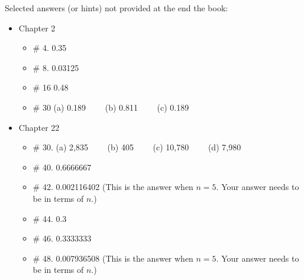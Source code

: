 \documentclass[12pt]{article}
\begin{document}
Selected answers (or hints) not provided at the end the book:
\begin{itemize}  %


\item Chapter 2          \label{ANS_2}
	\begin{itemize}
	\item  \# 4.  0.35
	\item  \# 8. 0.03125
	\item  \# 16 0.48
	\item  \# 30 (a) 0.189  \ \ \ \ (b) 0.811 \ \ \ \ (c)  0.189
	\end{itemize}


\item Chapter 22          \label{ANS_22}
	\begin{itemize}
	\item  \# 30. (a) 2,835  \ \ \ \ (b) 405 \ \ \ \  (c) 10,780  \ \ \ \ (d) 7,980 
	\item  \# 40. 0.6666667
	\item  \# 42. 0.002116402  (This is the answer when $n=5$. Your answer needs to be in terms of $n$.)
	\item  \# 44. 0.3
	\item  \# 46. 0.3333333
	\item  \# 48. 0.007936508  (This is the answer when $n=5$. Your answer needs to be in terms of $n$.)
	\end{itemize}


\end{itemize}
\end{document}
